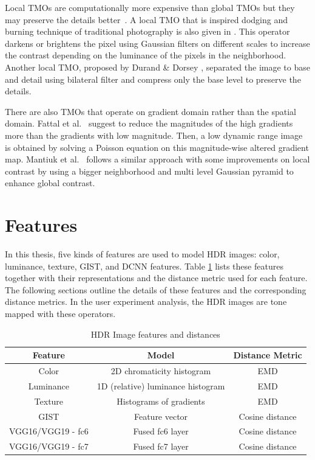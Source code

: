 Local TMOs are computationally more expensive than global TMOs but they may preserve the details better~\cite{Rein2010}. A local TMO that is inspired dodging and burning technique of traditional photography is also given in \cite{reinhard2002photographic}. This operator darkens or brightens the pixel using Gaussian filters on different scales to increase the contrast  depending on the luminance of the pixels in the neighborhood. Another local TMO, proposed by Durand \& Dorsey \cite{durand2002fast}, separated the image to base and detail using bilateral filter and compress only the base level to preserve the details. 

There are also TMOs that operate on gradient domain rather than the spatial domain. Fattal et al.~\cite{fattal2002gradient} suggest to reduce the magnitudes of the high gradients more than the gradients with low magnitude. Then, a low dynamic range image is obtained by solving a Poisson equation on this magnitude-wise altered gradient map. Mantiuk et al.~\cite{mantiuk2006perceptual} follows a similar approach with some improvements on local contrast by using a bigger neighborhood and multi level Gaussian pyramid to enhance global contrast.


\section{Features}
\label{sec:features}
In this thesis, five kinds of features are used to model HDR images: color, luminance, texture, GIST, and DCNN features. Table \ref{tab:table_feature} lists these features together with their representations and the distance metric used for each feature. The following sections outline the details of these features and the corresponding distance metrics. In the user experiment analysis, the HDR images are tone mapped with these operators.

\begin{table}
\caption{HDR Image features and distances}
\centering
\begin{tabular}{c|c|c}
\label{tab:table_feature}
\textbf{Feature} & \textbf{Model} & \textbf{Distance Metric}\\
\hline
Color  & 2D chromaticity histogram & EMD \\
Luminance  & 1D (relative) luminance histogram & EMD \\
Texture  & Histograms of gradients & EMD \\
GIST  & Feature vector & Cosine distance \\
VGG16/VGG19 - fc6 & Fused fc6 layer & Cosine distance  \\
VGG16/VGG19 - fc7 & Fused fc7 layer & Cosine distance
\end{tabular}
\end{table}

